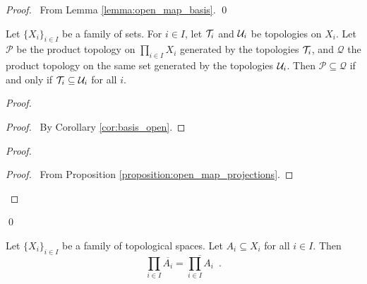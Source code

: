 \begin{proof}
    \pf\ From Lemma \ref{lemma:open_map_basis}. \qed
\end{proof}

\begin{proposition}
    Let $\{ X_i \}_{i \in I}$ be a family of sets. For $i \in I$, let $\mathcal{T}_i$ and $\mathcal{U}_i$ be topologies
    on $X_i$. Let $\mathcal{P}$ be the product topology on $\prod_{i \in I} X_i$ generated by
    the topologies $\mathcal{T}_i$, and $\mathcal{Q}$ the product topology on the same set generated by the topologies
    $\mathcal{U}_i$. Then $\mathcal{P} \subseteq \mathcal{Q}$ if and only if $\mathcal{T}_i \subseteq \mathcal{U}_i$ for all $i$.
\end{proposition}

\begin{proof}
    \pf
    \begin{proof}
        \pf\ By Corollary \ref{cor:basis_open}.
    \end{proof}
    \begin{proof}
        \begin{proof}
            \pf\ From Proposition \ref{proposition:open_map_projections}.
        \end{proof}
    \end{proof}
    \qed
\end{proof}

\begin{proposition}[AC]
    Let $\{ X_i \}_{i \in I}$ be a family of topological spaces. Let $A_i \subseteq X_i$ for all $i \in I$.
    Then
    \[ \prod_{i \in I} \overline{A_i} = \overline{\prod_{i \in I} A_i} \enspace . \]
\end{proposition}

